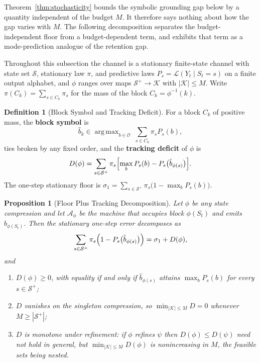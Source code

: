 \documentclass[12pt]{article}
\newtheorem{proposition}[theorem]{Proposition}
\theoremstyle{definition}
\newtheorem{definition}[theorem]{Definition}
\DeclareMathOperator*{\argmax}{arg\,max}
\newcommand{\Splus}{\mathcal S^{+}}
\begin{document}
Theorem~\ref{thm:stochasticity} bounds the symbolic grounding gap below by a
quantity independent of the budget $M$.  It therefore says nothing about how
the gap varies with $M$.  The following decomposition separates the
budget-independent floor from a budget-dependent term, and exhibits that term
as a mode-prediction analogue of the retention gap.

Throughout this subsection the channel is a stationary finite-state channel
with state set $\mathcal S$, stationary law $\pi$, and predictive laws
$P_s=\mathcal L(Y_t\mid S_t=s)$ on a finite output alphabet, and $\phi$ ranges
over maps $\Splus\to\mathcal K$ with $|\mathcal K|\le M$.  Write
$\pi(C_k)=\sum_{s\in C_k}\pi_s$ for the mass of the block $C_k=\phi^{-1}(k)$.

\begin{definition}[Block Symbol and Tracking Deficit]
\label{def:tracking-deficit}
For a block $C_k$ of positive mass, the \textbf{block symbol} is
\[
\hat b_k
\in
\argmax_{b\in\mathcal O}\ \sum_{s\in C_k}\pi_s P_s(b),
\]
ties broken by any fixed order, and the \textbf{tracking deficit} of $\phi$ is
\[
D(\phi)
=
\sum_{s\in\Splus}\pi_s
\Bigl[
\max_{b}P_s(b)-P_s\bigl(\hat b_{\phi(s)}\bigr)
\Bigr].
\]
The one-step stationary floor is
$\sigma_1=\sum_{s\in\Splus}\pi_s\bigl(1-\max_bP_s(b)\bigr)$.
\end{definition}

\begin{proposition}[Floor Plus Tracking Decomposition]
\label{prop:grounding-tracking}
Let $\phi$ be any state compression and let $\mathcal A_\phi$ be the machine
that occupies block $\phi(S_t)$ and emits $\hat b_{\phi(S_t)}$.  Then the
stationary one-step error decomposes as
\[
\sum_{s\in\Splus}\pi_s\Bigl(1-P_s\bigl(\hat b_{\phi(s)}\bigr)\Bigr)
=
\sigma_1+D(\phi),
\]
and
\begin{enumerate}[label=(\roman*)]
\item $D(\phi)\ge0$, with equality if and only if $\hat b_{\phi(s)}$ attains
$\max_bP_s(b)$ for every $s\in\Splus$;
\item $D$ vanishes on the singleton compression, so
$\min_{|\mathcal K|\le M}D=0$ whenever $M\ge|\Splus|$;
\item $D$ is monotone under refinement: if $\phi$ refines $\psi$ then
$D(\phi)\le D(\psi)$ need not hold in general, but
$\min_{|\mathcal K|\le M}D(\phi)$ is nonincreasing in $M$, the feasible sets
being nested.
\end{enumerate}
\end{proposition}
\end{document}
